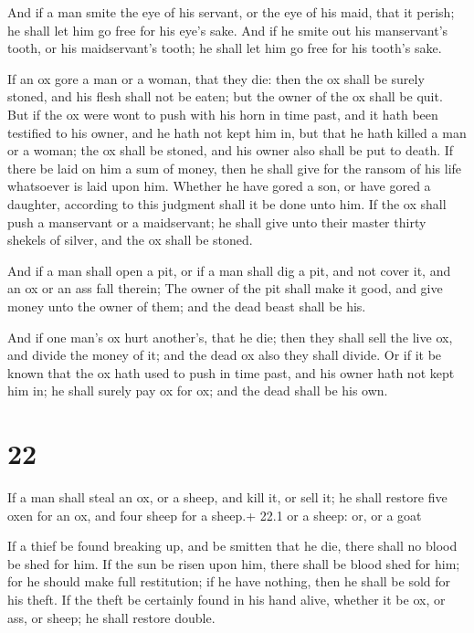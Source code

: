  And if a man smite the eye of his servant, or the eye of
his maid, that it perish; he shall let him go free for his eye's sake.
 And if he smite out his manservant's tooth, or his
maidservant's tooth; he shall let him go free for his tooth's sake.

 If an ox gore a man or a woman, that they die: then the
ox shall be surely stoned, and his flesh shall not be eaten; but the
owner of the ox shall be quit.  But if the ox were wont to
push with his horn in time past, and it hath been testified to his
owner, and he hath not kept him in, but that he hath killed a man or a
woman; the ox shall be stoned, and his owner also shall be put to death.
 If there be laid on him a sum of money, then he shall give
for the ransom of his life whatsoever is laid upon him. 
Whether he have gored a son, or have gored a daughter, according to this
judgment shall it be done unto him.  If the ox shall push a
manservant or a maidservant; he shall give unto their master thirty
shekels of silver, and the ox shall be stoned.

 And if a man shall open a pit, or if a man shall dig a
pit, and not cover it, and an ox or an ass fall therein; 
The owner of the pit shall make it good, and give money unto the owner
of them; and the dead beast shall be his.

 And if one man's ox hurt another's, that he die; then
they shall sell the live ox, and divide the money of it; and the dead ox
also they shall divide.  Or if it be known that the ox hath
used to push in time past, and his owner hath not kept him in; he shall
surely pay ox for ox; and the dead shall be his own.

\hypertarget{section-21}{%
\section{22}\label{section-21}}

 If a man shall steal an ox, or a sheep, and kill it, or
sell it; he shall restore five oxen for an ox, and four sheep for a
sheep.+ 22.1 or a sheep: or, or a goat

 If a thief be found breaking up, and be smitten that he
die, there shall no blood be shed for him.  If the sun be
risen upon him, there shall be blood shed for him; for he should make
full restitution; if he have nothing, then he shall be sold for his
theft.  If the theft be certainly found in his hand alive,
whether it be ox, or ass, or sheep; he shall restore double.

